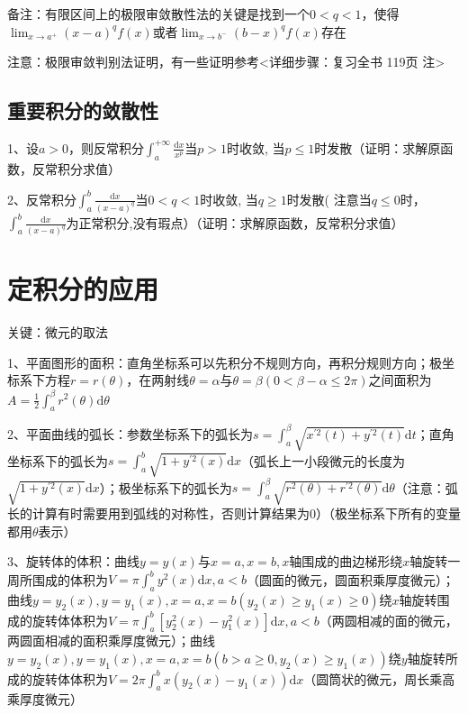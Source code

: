 备注：有限区间上的极限审敛散性法的关键是找到一个$0<q<1$，使得$\lim_{x \rightarrow a^{+}}(x-a)^{q} f(x)$或者$\lim_{x \rightarrow b^{-}}(b-x)^{q} f(x)$存在

注意：极限审敛判别法证明，有一些证明参考<详细步骤：复习全书 119页 注>



\subsection{重要积分的敛散性}

1、设$a>0$，则反常积分$\int_{a}^{+\infty} \frac{\mathrm{d} x}{x^{p}}$当$p>1$时收敛, 当$p \leqslant 1$时发散（证明：求解原函数，反常积分求值）

2、反常积分$\int_{a}^{b} \frac{\mathrm{d} x}{(x-a)^{q}}$当$0<q<1$时收敛, 当$q \geqslant 1$时发散( 注意当$q \leqslant 0$时，$\int_{a}^{b} \frac{\mathrm{d} x}{(x-a)^{q}}$为正常积分,没有瑕点）（证明：求解原函数，反常积分求值）

\section{定积分的应用}

关键：微元的取法

1、平面图形的面积：直角坐标系可以先积分不规则方向，再积分规则方向；极坐标系下方程$r=r(\theta)$，在两射线$\theta=\alpha$与$\theta=\beta(0<\beta-\alpha \leqslant 2 \pi)$之间面积为$A=\frac{1}{2} \int_{a}^{\beta} r^{2}(\theta) \mathrm{d} \theta$

2、平面曲线的弧长：参数坐标系下的弧长为$s=\int_{a}^{\beta} \sqrt{x^{\prime 2}(t)+y^{\prime 2}(t)} \mathrm{d} t$；直角坐标系下的弧长为$s=\int_{a}^{b} \sqrt{1+y^{\prime 2}(x)} \mathrm{d} x$（弧长上一小段微元的长度为$\sqrt{1+y^{\prime 2}(x)} \mathrm{d} x$）；极坐标系下的弧长为$s=\int_{a}^{\beta} \sqrt{r^{2}(\theta)+r^{\prime 2}(\theta)} \mathrm{d} \theta$（注意：弧长的计算有时需要用到弧线的对称性，否则计算结果为0）（极坐标系下所有的变量都用$\theta$表示）

3、旋转体的体积：曲线$y=y(x)$与$x=a, x=b, x$轴围成的曲边梯形绕$x$轴旋转一周所围成的体积为$V=\pi \int_{a}^{b} y^{2}(x) \mathrm{d} x, a<b$（圆面的微元，圆面积乘厚度微元）；曲线$y=y_{2}(x), y=y_{1}(x), x=a, x=b\left(y_{2}(x) \geqslant y_{1}(x) \geqslant 0\right)$绕$x$轴旋转围成的旋转体体积为$V=\pi \int_{a}^{b}\left[y_{2}^{2}(x)-y_{1}^{2}(x)\right] \mathrm{d} x, a<b$（两圆相减的面的微元，两圆面相减的面积乘厚度微元）；曲线$y=y_{2}(x), y=y_{1}(x), x=a, x=b\left(b>a \geqslant 0, y_{2}(x) \geqslant y_{1}(x)\right)$绕$y$轴旋转所成的旋转体体积为$V=2 \pi \int_{a}^{b} x\left(y_{2}(x)-y_{1}(x)\right) \mathrm{d} x$（圆筒状的微元，周长乘高乘厚度微元）

